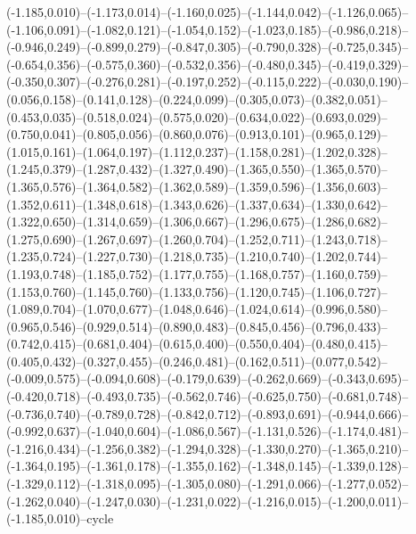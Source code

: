 \documentclass[10pt]{article}
\begin{document}
(-1.185,0.010)--(-1.173,0.014)--(-1.160,0.025)--(-1.144,0.042)--(-1.126,0.065)--(-1.106,0.091)--(-1.082,0.121)--(-1.054,0.152)--(-1.023,0.185)--(-0.986,0.218)--(-0.946,0.249)--(-0.899,0.279)--(-0.847,0.305)--(-0.790,0.328)--(-0.725,0.345)--(-0.654,0.356)--(-0.575,0.360)--(-0.532,0.356)--(-0.480,0.345)--(-0.419,0.329)--(-0.350,0.307)--(-0.276,0.281)--(-0.197,0.252)--(-0.115,0.222)--(-0.030,0.190)--(0.056,0.158)--(0.141,0.128)--(0.224,0.099)--(0.305,0.073)--(0.382,0.051)--(0.453,0.035)--(0.518,0.024)--(0.575,0.020)--(0.634,0.022)--(0.693,0.029)--(0.750,0.041)--(0.805,0.056)--(0.860,0.076)--(0.913,0.101)--(0.965,0.129)--(1.015,0.161)--(1.064,0.197)--(1.112,0.237)--(1.158,0.281)--(1.202,0.328)--(1.245,0.379)--(1.287,0.432)--(1.327,0.490)--(1.365,0.550)--(1.365,0.570)--(1.365,0.576)--(1.364,0.582)--(1.362,0.589)--(1.359,0.596)--(1.356,0.603)--(1.352,0.611)--(1.348,0.618)--(1.343,0.626)--(1.337,0.634)--(1.330,0.642)--(1.322,0.650)--(1.314,0.659)--(1.306,0.667)--(1.296,0.675)--(1.286,0.682)--(1.275,0.690)--(1.267,0.697)--(1.260,0.704)--(1.252,0.711)--(1.243,0.718)--(1.235,0.724)--(1.227,0.730)--(1.218,0.735)--(1.210,0.740)--(1.202,0.744)--(1.193,0.748)--(1.185,0.752)--(1.177,0.755)--(1.168,0.757)--(1.160,0.759)--(1.153,0.760)--(1.145,0.760)--(1.133,0.756)--(1.120,0.745)--(1.106,0.727)--(1.089,0.704)--(1.070,0.677)--(1.048,0.646)--(1.024,0.614)--(0.996,0.580)--(0.965,0.546)--(0.929,0.514)--(0.890,0.483)--(0.845,0.456)--(0.796,0.433)--(0.742,0.415)--(0.681,0.404)--(0.615,0.400)--(0.550,0.404)--(0.480,0.415)--(0.405,0.432)--(0.327,0.455)--(0.246,0.481)--(0.162,0.511)--(0.077,0.542)--(-0.009,0.575)--(-0.094,0.608)--(-0.179,0.639)--(-0.262,0.669)--(-0.343,0.695)--(-0.420,0.718)--(-0.493,0.735)--(-0.562,0.746)--(-0.625,0.750)--(-0.681,0.748)--(-0.736,0.740)--(-0.789,0.728)--(-0.842,0.712)--(-0.893,0.691)--(-0.944,0.666)--(-0.992,0.637)--(-1.040,0.604)--(-1.086,0.567)--(-1.131,0.526)--(-1.174,0.481)--(-1.216,0.434)--(-1.256,0.382)--(-1.294,0.328)--(-1.330,0.270)--(-1.365,0.210)--(-1.364,0.195)--(-1.361,0.178)--(-1.355,0.162)--(-1.348,0.145)--(-1.339,0.128)--(-1.329,0.112)--(-1.318,0.095)--(-1.305,0.080)--(-1.291,0.066)--(-1.277,0.052)--(-1.262,0.040)--(-1.247,0.030)--(-1.231,0.022)--(-1.216,0.015)--(-1.200,0.011)--(-1.185,0.010)--cycle 
\end{document}
